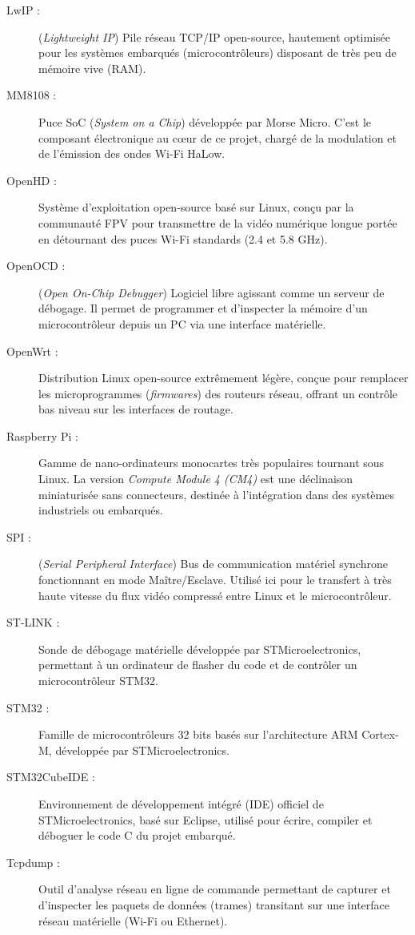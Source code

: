 \begin{description}
    \item[LwIP :] (\textit{Lightweight IP}) Pile réseau TCP/IP open-source, hautement optimisée pour les systèmes embarqués (microcontrôleurs) disposant de très peu de mémoire vive (RAM).
    
    \item[MM8108 :] Puce SoC (\textit{System on a Chip}) développée par Morse Micro. C'est le composant électronique au cœur de ce projet, chargé de la modulation et de l'émission des ondes Wi-Fi HaLow.
    
    \item[OpenHD :] Système d'exploitation open-source basé sur Linux, conçu par la communauté FPV pour transmettre de la vidéo numérique longue portée en détournant des puces Wi-Fi standards (2.4 et 5.8 GHz).
    
    \item[OpenOCD :] (\textit{Open On-Chip Debugger}) Logiciel libre agissant comme un serveur de débogage. Il permet de programmer et d'inspecter la mémoire d'un microcontrôleur depuis un PC via une interface matérielle.
    
    \item[OpenWrt :] Distribution Linux open-source extrêmement légère, conçue pour remplacer les microprogrammes (\textit{firmwares}) des routeurs réseau, offrant un contrôle bas niveau sur les interfaces de routage.
    
    \item[Raspberry Pi :] Gamme de nano-ordinateurs monocartes très populaires tournant sous Linux. La version \textit{Compute Module 4 (CM4)} est une déclinaison miniaturisée sans connecteurs, destinée à l'intégration dans des systèmes industriels ou embarqués.
    
    \item[SPI :] (\textit{Serial Peripheral Interface}) Bus de communication matériel synchrone fonctionnant en mode Maître/Esclave. Utilisé ici pour le transfert à très haute vitesse du flux vidéo compressé entre Linux et le microcontrôleur.
    
    \item[ST-LINK :] Sonde de débogage matérielle développée par STMicroelectronics, permettant à un ordinateur de flasher du code et de contrôler un microcontrôleur STM32.
    
    \item[STM32 :] Famille de microcontrôleurs 32 bits basés sur l'architecture ARM Cortex-M, développée par STMicroelectronics.
    
    \item[STM32CubeIDE :] Environnement de développement intégré (IDE) officiel de STMicroelectronics, basé sur Eclipse, utilisé pour écrire, compiler et déboguer le code C du projet embarqué.
    
    \item[Tcpdump :] Outil d'analyse réseau en ligne de commande permettant de capturer et d'inspecter les paquets de données (trames) transitant sur une interface réseau matérielle (Wi-Fi ou Ethernet).
\end{description}